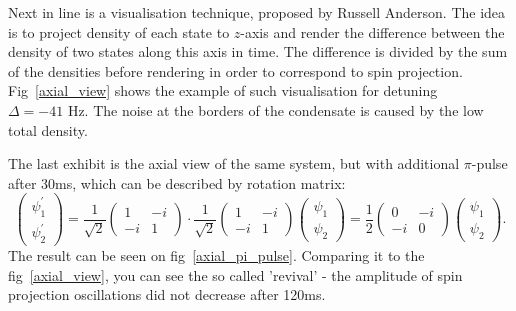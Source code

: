 \documentclass[12pt,notitlepage]{report}
\begin{document}
Next in line is a visualisation technique, proposed by Russell Anderson. The idea is to project density of each state to $z$-axis and render the difference between the density of two states along this axis in time. The difference is divided by the sum of the densities before rendering in order to correspond to spin projection. Fig~\ref{axial_view} shows the example of such visualisation for detuning $\Delta = -41 \textrm{ Hz}$. The noise at the borders of the condensate is caused by the low total density.

The last exhibit is the axial view of the same system, but with additional $\pi$-pulse after 30ms, which can be described by rotation matrix:
\[
\begin{pmatrix}
	\psi^\prime_1 \\	\psi^\prime_2
\end{pmatrix} =
\frac{1}{\sqrt{2}} \begin{pmatrix}
	1 & -i \\ -i & 1
\end{pmatrix} \cdot
\frac{1}{\sqrt{2}} \begin{pmatrix}
	1 & -i \\ -i & 1
\end{pmatrix}
\begin{pmatrix}
	\psi_1 \\ \psi_2
\end{pmatrix} =
\frac{1}{2} \begin{pmatrix}
	0 & -i \\ -i & 0
\end{pmatrix}
\begin{pmatrix}
	\psi_1 \\ \psi_2
\end{pmatrix}.
\]
The result can be seen on fig~\ref{axial_pi_pulse}. Comparing it to the fig~\ref{axial_view}, you can see the so called 'revival' - the amplitude of spin projection oscillations did not decrease after 120ms.



\end{document}
